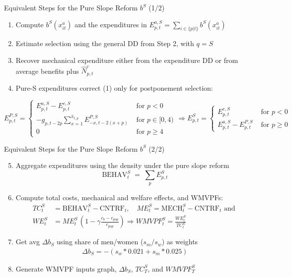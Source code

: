 \begin{frame}{Equivalent Steps for the Pure Slope Reform $b^{S}$ (1/2)}
\begin{enumerate}
    \item Compute ${b}^S(x^a_{it})$ and {the expenditures in $E^{a,S}_{p,t} = \sum_{i \in \{p|t\}} b^S(x^a_{it})$}
    \item Estimate selection using the general DD from Step 2, with $q=S$
    \item Recover mechanical expenditure either from the expenditure DD or from average benefits plus $\widehat N^c_{p,t}$

    \item Pure-S expenditures correct (1) only for postponement selection:
\end{enumerate}
{\tiny
    \[
    E^{P,S}_{p,t}
    =
    \begin{cases}
        E^{a,S}_{p,t}-E^{c,S}_{p,t} & \text{ for } p<0 \\
        -g_{p,t-2p}
            \sum_{x=1}^{\bar x_{t,p}}
            {E^{P,S}_{-x,t-2(x+p)}} & \text{ for } p\in [0,4) \\
        0 & \text{ for } p\geq 4
    \end{cases} \Rightarrow
    E^{S}_{p,t}
    =
    \begin{cases}
        E^{c,S}_{p,t} & \text{ for } p<0 \\
        E^{a,S}_{p,t}-E^{P,S}_{p,t} & \text{ for } p\geq 0
    \end{cases}
    \]}
\end{frame}

\begin{frame}{Equivalent Steps for the Pure Slope Reform $b^{S}$ (2/2)}
\begin{enumerate}
    \setcounter{enumi}{4}

    \item Aggregate {expenditures} using the density under the pure slope reform
    \[
        \text{BEHAV}^{S}_t
        \;=\;
        \sum_{p}
        {E^{S}_{p,t}
        }
    \]

    \item Compute total costs, mechanical and welfare effects, and WMVPFs:
    \begin{align*}
        TC^S_t &= \text{BEHAV}_t^{S} - \text{CNTRF}_t, \quad
        ME^S_t = \text{MECH}_t^{S} - \text{CNTRF}_t \text{ and }\\
        WE^S_t &= ME^S_t \, \left(1-\gamma \frac{c_b - c_{pop}}{c_{pop}}\right)
        \Rightarrow WMVPF_t^S = \frac{WE^S_t}{TC^S_t}
    \end{align*}

    \item Get avg $\Delta b_S$ using share of men/women ($s_m/s_w$) as weights
    \begin{align*}
        \Delta b_S = -(s_w*0.021+s_m*0.025)
    \end{align*}

    \item Generate WMVPF inputs graph, $\Delta b_S$, $TC_T^S$, and $WMVPF_T^S$
\end{enumerate}
\end{frame}

